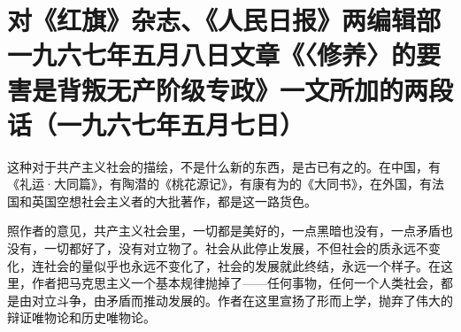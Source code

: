 \section[对《红旗》杂志、《人民日报》两编辑部一九六七年五月八日文章《〈修养〉的要害是背叛无产阶级专政》一文所加的两段话（一九六七年五月七日）]{对《红旗》杂志、《人民日报》两编辑部一九六七年五月八日文章《〈修养〉的要害是背叛无产阶级专政》一文所加的两段话（一九六七年五月七日）}


这种对于共产主义社会的描绘，不是什么新的东西，是古已有之的。在中国，有《礼运·大同篇》，有陶潜的《桃花源记》，有康有为的《大同书》，在外国，有法国和英国空想社会主义者的大批著作，都是这一路货色。

照作者的意见，共产主义社会里，一切都是美好的，一点黑暗也没有，一点矛盾也没有，一切都好了，没有对立物了。社会从此停止发展，不但社会的质永远不变化，连社会的量似乎也永远不变化了，社会的发展就此终结，永远一个样子。在这里，作者把马克思主义一个基本规律抛掉了——任何事物，任何一个人类社会，都是由对立斗争，由矛盾而推动发展的。作者在这里宣扬了形而上学，抛弃了伟大的辩证唯物论和历史唯物论。

